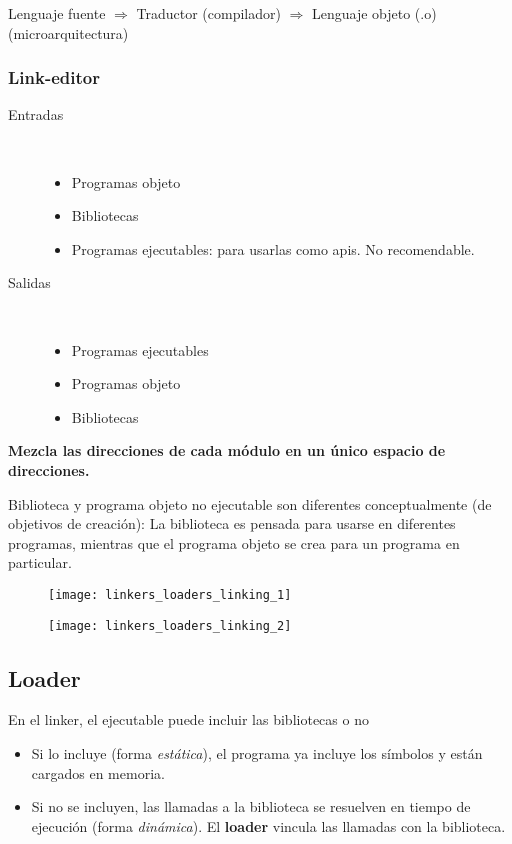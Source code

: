\documentclass[a4paper, twoside]{article}
\begin{document}
\begin{center}
	Lenguaje fuente $\Rightarrow$ Traductor (compilador) $\Rightarrow$ Lenguaje objeto (.o) (microarquitectura)
\end{center}

\subsubsection{Link-editor}
\begin{description}
	\item[Entradas] ~
	\begin{itemize}
		\item Programas objeto
		\item Bibliotecas
		\item Programas ejecutables: para usarlas como apis. No recomendable.
	\end{itemize}

	\item[Salidas] ~
	\begin{itemize}
		\item Programas ejecutables
		\item Programas objeto
		\item Bibliotecas
	\end{itemize}
\end{description}

\textbf{Mezcla las direcciones de cada módulo en un único espacio de direcciones.}

Biblioteca y programa objeto no ejecutable son diferentes conceptualmente (de objetivos de creación):
La biblioteca es pensada para usarse en diferentes programas, mientras que el programa objeto se crea para un programa en particular.

\begin{figure}[H]
	\centering
	\texttt{[image: linkers\_loaders\_linking\_1]}
	\label{fig:linkers_loaders_linking_1}
\end{figure}

\begin{figure}[H]
	\centering
	\texttt{[image: linkers\_loaders\_linking\_2]}
	\label{fig:linkers_loaders_linking_2}
\end{figure}

\subsection{Loader}
En el linker, el ejecutable puede incluir las bibliotecas o no
\begin{itemize}
	\item Si lo incluye (forma \emph{estática}), el programa ya incluye los símbolos y están cargados en memoria.
	\item Si no se incluyen, las llamadas a la biblioteca se resuelven en tiempo de ejecución (forma \emph{dinámica}). El \textbf{loader} vincula las llamadas con la biblioteca.
\end{itemize}
	
\end{document}
